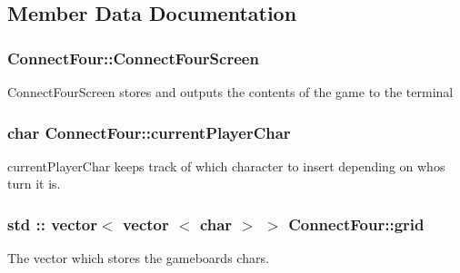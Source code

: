 \subsection{Member Data Documentation}
\hypertarget{classConnectFour_a7548207e4c83260233e8d3668ae3e7e2}{
\subsubsection[{Connect\-Four\-Screen}]{ Connect\-Four\-::\-Connect\-Four\-Screen\hspace{0.3cm}{\ttfamily [private]}}}\label{classConnectFour_a7548207e4c83260233e8d3668ae3e7e2}
Connect\-Four\-Screen stores and outputs the contents of the game to the terminal \hypertarget{classConnectFour_adc938d715dbe28efc1db3b4a1dc866cb}{
\subsubsection[{current\-Player\-Char}]{\setlength{\rightskip}{0pt plus 5cm}char Connect\-Four\-::current\-Player\-Char\hspace{0.3cm}{\ttfamily [private]}}}\label{classConnectFour_adc938d715dbe28efc1db3b4a1dc866cb}
current\-Player\-Char keeps track of which character to insert depending on whos turn it is. \hypertarget{classConnectFour_a42275b6a7a1b490b7e9adc3e2d5480d9}{
\subsubsection[{grid}]{\setlength{\rightskip}{0pt plus 5cm}std \-:: vector$<$ vector $<$ char $>$ $>$ Connect\-Four\-::grid\hspace{0.3cm}{\ttfamily [private]}}}\label{classConnectFour_a42275b6a7a1b490b7e9adc3e2d5480d9}


The vector which stores the gameboards chars. 

